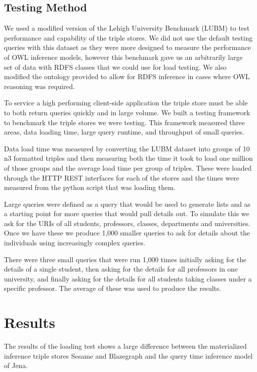 \documentclass{llncs}
\begin{document}
\subsection{Testing Method}
We used a modified version of the Lehigh University Benchmark (LUBM) \cite{Guo2005} to test performance and capability of the triple stores.  We did not use the default testing queries with this dataset as they were more designed to measure the performance of OWL inference models, however this benchmark gave us an arbitrarily large set of data with RDFS classes that we could use for load testing.  We also modified the ontology provided to allow for RDFS inference in cases where OWL reasoning was required.

To service a high performing client-side application the triple store must be able to both return queries quickly and in large volume.  We built a testing framework to benchmark the triple stores we were testing.  This framework measured three areas, data loading time, large query runtime, and throughput of small queries.

Data load time was measured by converting the LUBM dataset into groups of 10 n3 formatted triples and then measuring both the time it took to load one million of those groups and the average load time per group of triples.  These were loaded through the HTTP REST interfaces for each of the stores and the times were measured from the python script that was loading them.

Large queries were defined as a query that would be used to generate lists and as a starting point for more queries that would pull details out.  To simulate this we ask for the URIs of all students, professors, classes, departments and universities.  Once we have these we produce 1,000 smaller queries to ask for details about the individuals using increasingly complex queries.

There were three small queries that were run 1,000 times initially asking for the details of a single student, then asking for the details for all professors in one university, and finally asking for the details for all students taking classes under a specific professor.  The average of these was used to produce the results.


\section{Results}
The results of the loading test shows a large difference between the materialized inference triple stores Sesame and Blazegraph and the query time inference model of Jena.
\end{document}
